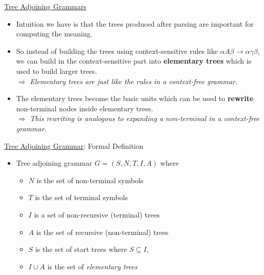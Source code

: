 \documentclass[landscape]{slides}
\begin{document}

\begin{slide}{\underline{Tree Adjoining Grammars}}
\begin{itemize}
\item Intuition we have is that the trees produced after parsing are
important for computing the meaning. 
\item So instead of building the trees
using context-sensitive rules like $\alpha A \beta \rightarrow \alpha
\gamma \beta$, we can build in the context-sensitive part into 
{\bf elementary trees} which is used to build larger trees.\\
$\Rightarrow$ \textit{Elementary trees are just like the rules in a context-free grammar.}
\item The elementary trees become the basic units which
can be used to {\bf rewrite} non-terminal nodes inside 
elementary trees.\\
$\Rightarrow$ \textit{This rewriting is analogous to expanding a non-terminal
in a context-free grammar.}
\end{itemize}
\end{slide}

\begin{slide}{\underline{Tree Adjoining Grammar}: Formal Definition}
\begin{itemize}
\item Tree adjoining grammar $G = (S, N, T, I, A)$ where
\begin{itemize}
\item $N$ is the set of non-terminal symbols
\item $T$ is the set of terminal symbols
\item $I$ is a set of non-recursive (terminal) trees 
\item $A$ is the set of recursive (non-terminal) trees
\item $S$ is the set of start trees where $S \subseteq I$, 
\item $I \cup A$ is the set of {\em elementary trees}
\end{itemize}
\end{itemize}
\end{slide}
\end{document}
